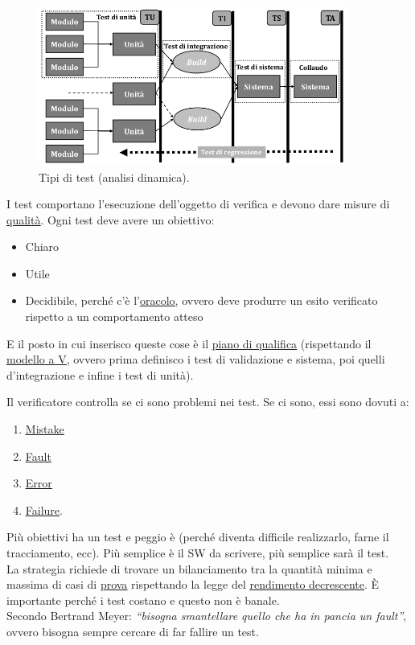 		\begin{figure}[H]
			\centering
			\includegraphics[width=0.9\textwidth]{img/test}
			\caption{Tipi di test (analisi dinamica).}
		\end{figure}
		I test comportano l'esecuzione dell'oggetto di verifica e devono dare misure di \underline{\hyperref[qualita]{qualità}}. Ogni test deve avere un obiettivo:
		\begin{itemize}
			\item Chiaro
			\item Utile
			\item Decidibile, perché c'è l'\underline{\hyperref[oracolo]{oracolo}}, ovvero deve produrre un esito verificato rispetto a un comportamento atteso
		\end{itemize}
		E il posto in cui inserisco queste cose è il \underline{\hyperref[pianoqualifica]{piano di qualifica}} (rispettando il \underline{\hyperref[V]{modello a V}}, ovvero prima definisco i test di validazione e sistema, poi quelli d'integrazione e infine i test di unità).

		Il verificatore controlla se ci sono problemi nei test. Se ci sono, essi sono dovuti a:
		\begin{enumerate}
			\item \underline{\hyperref[mistake]{Mistake}}
			\item \underline{\hyperref[fault]{Fault}}
			\item \underline{\hyperref[error]{Error}}
			\item \underline{\hyperref[failure]{Failure}}.
		\end{enumerate}
		Più obiettivi ha un test e peggio è (perché diventa difficile realizzarlo, farne il tracciamento, ecc).
		Più semplice è il SW da scrivere, più semplice sarà il test. \\
		La strategia richiede di trovare un bilanciamento tra la quantità minima e massima di casi di \underline{\hyperref[prova]{prova}} rispettando la legge del \underline{\hyperref[diminishingreturn]{rendimento decrescente}}.
		È importante perché i test costano e questo non è banale. \\
		Secondo Bertrand Meyer: \textit{``bisogna smantellare quello che ha in pancia un fault''}, ovvero bisogna sempre cercare di far fallire un test. \\ %

